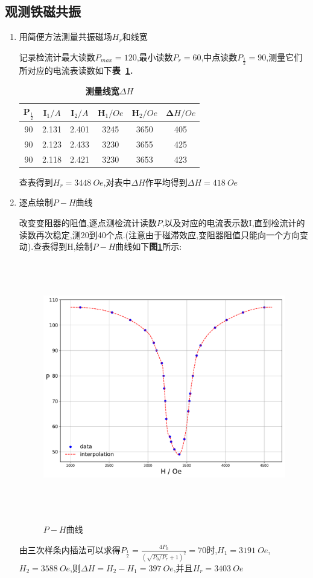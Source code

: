 \documentclass[a4paper]{article}
\begin{document}
\subsection{观测铁磁共振}\label{sub2}
\begin{enumerate}[1)]
\item 用简便方法测量共振磁场$H_r$和线宽

记录检流计最大读数$P_{max}=120$,最小读数$P_r=60$,中点读数$P_{\frac{1}{2}}=90$,测量它们所对应的电流表读数如下\textbf{表~\ref{tab:table1}.}
\begin{table}[H]
\caption{\textbf{测量线宽$\Delta H$}}
\label{tab:table1}
\begin{center}
\setlength{\tabcolsep}{7mm}
\begin{tabular}{|c|c|c|c|c|c|}%
    \toprule
	\hline
	$\bm P_{\frac{1}{2}}$ & $\bm I_1/\si{A}$ & $\bm I_2/\si{A}$ & $\bm H_1/\si{Oe}$ & $\bm H_2/\si{Oe}$ & $\bm \Delta H/\si{Oe}$\\ \hline \hline
	90 & 2.131 & 2.401 & 3245 & 3650 & 405 \\ \hline
	90 & 2.123 & 2.433 & 3230 & 3655 & 425\\ \hline
	90 & 2.118 & 2.421 & 3230 & 3653 & 423\\ \hline
	\bottomrule
	\end{tabular}
\end{center}
\end{table}
查表得到$H_r=\SI{3448}{Oe}$,对表中$\Delta H$作平均得到$\Delta H=\SI{418}{Oe}$
\item 逐点绘制$P-H$曲线

改变变阻器的阻值,逐点测检流计读数$P$,以及对应的电流表示数I,直到检流计的读数再次稳定,测20到40个点.(注意由于磁滞效应,变阻器阻值只能向一个方向变动).查表得到H,绘制$P-H$曲线如下\textbf{图\ref{fig:fig1}}所示:
\begin{figure}[H]
 \centering
 \caption{$P-H$曲线}
 \includegraphics[height=11cm, width=15cm]{images/phyex1_fig.pdf}
 \label{fig:fig1}
\end{figure}
由三次样条内插法可以求得$P_{\frac{1}{2}}=\frac{4P_0}{(\sqrt{P_0/P_r}+1)^2}=70$时,$H_1=\SI{3191}{Oe}$,$H_2=\SI{3588}{Oe}$,则$\Delta H=H_2-H_1=\SI{397}{Oe}$,并且$H_r=\SI{3403}{Oe}$
\end{enumerate}
\newpage
\end{document}
